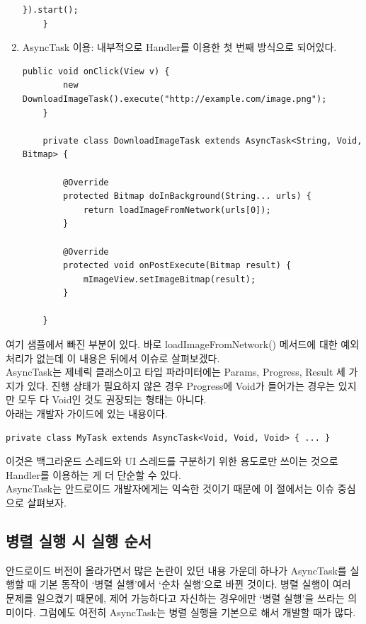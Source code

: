 \begin{enumerate}
\begin{lstlisting}[frame=single]
    	}).start();
	}
\end{lstlisting}
	
\item AsyncTask 이용: 내부적으로 Handler를 이용한 첫 번째 방식으로 되어있다.
\begin{lstlisting}[frame=single]
	public void onClick(View v) {
    	new DownloadImageTask().execute("http://example.com/image.png");
	}

	private class DownloadImageTask extends AsyncTask<String, Void, Bitmap> {
	
		@Override
    	protected Bitmap doInBackground(String... urls) {
        	return loadImageFromNetwork(urls[0]);
    	}

      	@Override
    	protected void onPostExecute(Bitmap result) {
        	mImageView.setImageBitmap(result);
    	}
    	
	}	
\end{lstlisting}
\end{enumerate}
여기 샘플에서 빠진 부분이 있다. 바로 loadImageFromNetwork() 메서드에 대한 예외 처리가 없는데 이 내용은 뒤에서 이슈로 살펴보겠다.\\

AsyncTask는 제네릭 클래스이고 타입 파라미터에는 Params, Progress, Result 세 가지가 있다. 진행 상태가 필요하지 않은 경우 Progress에 Void가 들어가는 경우는 있지만 모두 다 Void인 것도 권장되는 형태는 아니다.\\

아래는 개발자 가이드에 있는 내용이다.
\begin{lstlisting}[frame=single]
private class MyTask extends AsyncTask<Void, Void, Void> { ... }
\end{lstlisting}
이것은 백그라운드 스레드와 UI 스레드를 구분하기 위한 용도로만 쓰이는 것으로 Handler를 이용하는 게 더 단순할 수 있다.\\

AsyncTask는 안드로이드 개발자에게는 익숙한 것이기 때문에 이 절에서는 이슈 중심으로 살펴보자.

\subsection{병렬 실행 시 실행 순서}
안드로이드 버전이 올라가면서 많은 논란이 있던 내용 가운데 하나가 AsyncTask를 실행할 때 기본 동작이 `병렬 실행'에서 `순차 실행'으로 바뀐 것이다. 
병렬 실행이 여러 문제를 일으켰기 때문에, 제어 가능하다고 자신하는 경우에만 `병렬 실행'을 쓰라는 의미이다.
그럼에도 여전히 AsyncTask는 병렬 실행을 기본으로 해서 개발할 때가 많다.\\

